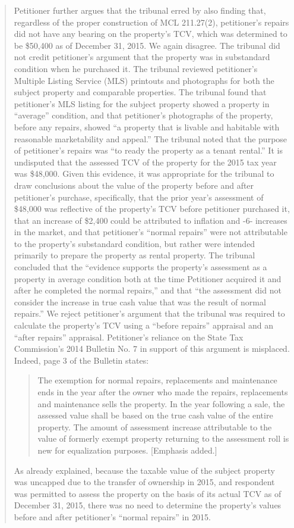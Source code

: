 \documentclass[12pt,\documentclassflag]{michiganCourtOfAppealsBrief}
\begin{document}
\begin {quotation}
Petitioner further argues that the tribunal erred by also finding that, regardless of the proper
construction of MCL 211.27(2), petitioner's repairs did not have any bearing on the property's
TCV, which was determined to be \$50,400 as of December 31, 2015. We again disagree. The
tribunal did not credit petitioner's argument that the property was in substandard condition when
he purchased it. The tribunal reviewed petitioner's Multiple Listing Service (MLS) printouts and
photographs for both the subject property and comparable properties. The tribunal found that
petitioner's MLS listing for the subject property showed a property in ``average'' condition, and
that petitioner's photographs of the property, before any repairs, showed ``a property that is livable
and habitable with reasonable marketability and appeal.'' The tribunal noted that the purpose of
petitioner's repairs was ``to ready the property as a tenant rental.'' It is undisputed that the assessed
TCV of the property for the 2015 tax year was \$48,000. Given this evidence, it was appropriate
for the tribunal to draw conclusions about the value of the property before and after petitioner's
purchase, specifically, that the prior year's assessment of \$48,000 was reflective of the property's
TCV before petitioner purchased it, that an increase of \$2,400 could be attributed to inflation and 
-6-
increases in the market, and that petitioner's ``normal repairs'' were not attributable to the
property's substandard condition, but rather were intended primarily to prepare the property as
rental property. The tribunal concluded that the ``evidence supports the property's assessment as
a property in average condition both at the time Petitioner acquired it and after he completed the
normal repairs,'' and that ``the assessment did not consider the increase in true cash value that was
the result of normal repairs.''
We reject petitioner's argument that the tribunal was required to calculate the property's
TCV using a ``before repairs'' appraisal and an ``after repairs'' appraisal. Petitioner's reliance on
the State Tax Commission's 2014 Bulletin No. 7 in support of this argument is misplaced. Indeed,
page 3 of the Bulletin states:

\begin{quote}
The exemption for normal repairs, replacements and maintenance ends in
the year after the owner who made the repairs, replacements and maintenance sells
the property. In the year following a sale, the assessed value shall be based on the
true cash value of the entire property. The amount of assessment increase
attributable to the value of formerly exempt property returning to the assessment
roll is new for equalization purposes. [Emphasis added.] 
\end{quote}

As already explained, because the taxable value of the subject property was uncapped due to the
transfer of ownership in 2015, and respondent was permitted to assess the property on the basis of
its actual TCV as of December 31, 2015, there was no need to determine the property's values
before and after petitioner's ``normal repairs'' in 2015.
\end{quotation}
\end{document}
